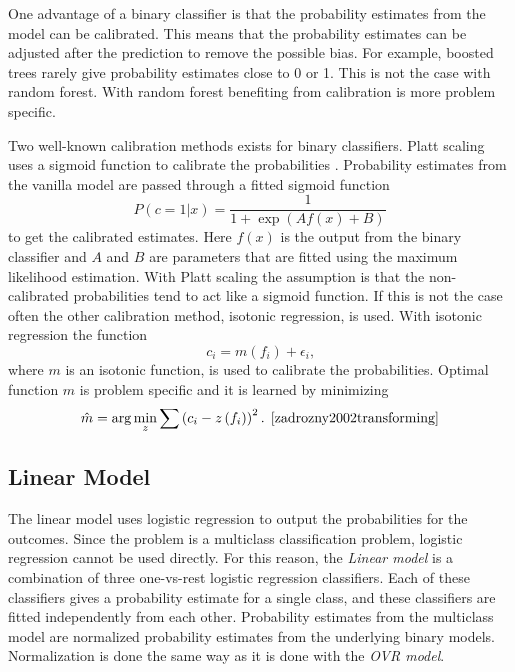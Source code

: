 One advantage of a binary classifier is that the probability estimates from the model can be calibrated. This means that the probability estimates can be adjusted after the prediction to remove the possible bias. For example, boosted trees rarely give probability estimates close to 0 or 1. This is not the case with random forest. With random forest benefiting from calibration is more problem specific. \cite{niculescu2005predicting}

Two well-known calibration methods exists for binary classifiers. Platt scaling uses a sigmoid function to calibrate the probabilities \cite{platt1999probabilistic}. Probability estimates from the vanilla model are passed through a fitted sigmoid function
\begin{equation}
P ( c = 1 | x ) = \frac { 1 } { 1 + \exp ( A f(x) + B ) }
\end{equation}
to get the calibrated estimates. Here $f(x)$ is the output from the binary classifier and $A$ and $B$ are parameters that are fitted using the maximum likelihood estimation. With Platt scaling the assumption is that the non-calibrated probabilities tend to act like a sigmoid function. If this is not the case often the other calibration method, isotonic regression, is used. With isotonic regression the function
\begin{equation}
c _ { i } = m \left( f _ { i } \right) + \epsilon _ { i } \text{,}
\end{equation}
where $m$ is an isotonic function, is used to calibrate the probabilities. Optimal function $m$ is problem specific and it is learned by minimizing
\begin{equation}
\hat { m } = \arg \min _ { z } \sum \left( c _ { i } - z \left( f _ { i } \right) \right) ^ { 2 } \text{. \cite{zadrozny2002transforming}}
\end{equation}

\subsection{Linear Model}
The linear model uses logistic regression to output the probabilities for the outcomes. Since the problem is a multiclass classification problem, logistic regression cannot be used directly. For this reason, the \textit{Linear model} is a combination of three one-vs-rest logistic regression classifiers. Each of these classifiers gives a probability estimate for a single class, and these classifiers are fitted independently from each other. Probability estimates from the multiclass model are normalized probability estimates from the underlying binary models. Normalization is done the same way as it is done with the \textit{OVR model}.

